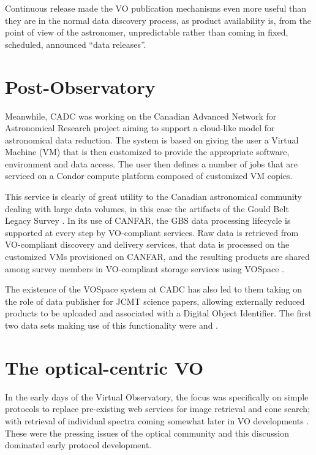 \documentclass[final,authoryear,5p,times,twocolumn]{elsarticle}
\begin{document}
Continuous release made the VO publication mechanisms even more useful
than they are in the normal data discovery process, as product
availability is, from the point of view of the astronomer,
unpredictable rather than coming in fixed, scheduled, announced ``data
releases''.

\section{Post-Observatory}

Meanwhile, CADC was working on the Canadian Advanced Network for
Astronomical Research \citep[CANFAR;][]{2010SPIE.7740E..51G,2014ACCADC} project aiming to
support a cloud-like model for astronomical data reduction. The system
is based on giving the user a Virtual Machine (VM) that is then customized to
provide the appropriate software, environment and data access. The
user then defines a number of jobs that are serviced on a Condor
compute platform composed of customized VM copies.

This service is clearly of great utility to the Canadian astronomical
community dealing with large data volumes, in this case the artifacts of
the Gould Belt Legacy Survey \citep[GBS;][]{2007PASP..119..855W}.
In its use of CANFAR, the GBS data
processing lifecycle is supported at every step by VO-compliant services.
Raw data is retrieved from VO-compliant discovery and delivery services,
that data is processed on the customized VMs provisioned on CANFAR, and
the resulting products are shared among survey members in VO-compliant
storage services using VOSpace \citep{vospace}.

The existence of the VOSpace system at CADC has also led to them
taking on the role of data publisher for JCMT science papers, allowing
externally reduced products to be uploaded and associated with a
Digital Object Identifier. The first two data sets making use of this
functionality were \citet{2012MNRAS.424.3050W} and
\citet{2013ApJS..209....8D}.

\section{The optical-centric VO}

In the early days of the Virtual Observatory, the focus was
specifically on simple protocols \citep{siap,cone} to replace pre-existing
web services for image retrieval and cone search; with retrieval of
individual spectra coming somewhat later in VO developments
\citep{ssap,splatvo}. These were the pressing issues of the optical
community and this discussion dominated early protocol development.
\end{document}
